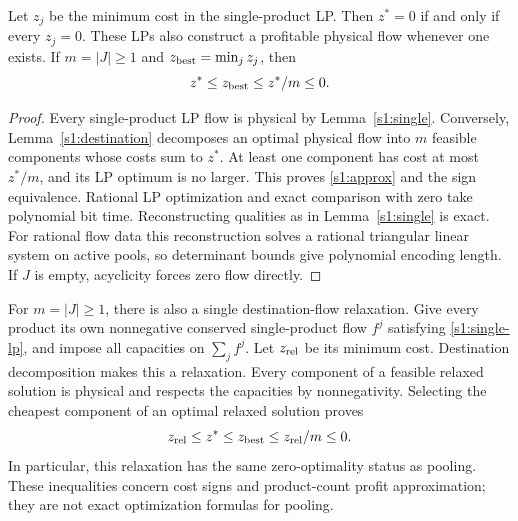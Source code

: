 \begin{theorem}\label{s1:sign}
Let $z_j$ be the minimum cost in the single-product LP. Then
$z^*=0$ if and only if every $z_j=0$. These LPs also construct a
profitable physical flow whenever one exists. If $m=|J|\ge1$ and
$z_{\rm best}=\min_jz_j$, then
\begin{equation}
 z^*\le z_{\rm best}\le z^*/m\le0.\label{s1:approx}
\end{equation}
\end{theorem}
\begin{proof}
Every single-product LP flow is physical by Lemma~\ref{s1:single}.
Conversely, Lemma~\ref{s1:destination} decomposes an optimal physical
flow into $m$ feasible components whose costs sum to $z^*$.
At least one component has cost at most $z^*/m$, and its LP optimum is
no larger. This proves \eqref{s1:approx} and the sign equivalence.
Rational LP optimization and exact comparison with zero take polynomial
bit time. Reconstructing qualities as in Lemma~\ref{s1:single} is exact.
For rational flow data this reconstruction solves a rational triangular
linear system on active pools, so determinant bounds give polynomial
encoding length. If $J$ is empty, acyclicity forces zero flow directly.
\end{proof}

For $m=|J|\ge1$, there is also a single destination-flow relaxation. Give every product
its own nonnegative conserved single-product flow $f^j$ satisfying
\eqref{s1:single-lp}, and impose all capacities on $\sum_j f^j$.
Let $z_{\rm rel}$ be its minimum cost. Destination decomposition makes
this a relaxation. Every component of a feasible relaxed solution is
physical and respects the capacities by nonnegativity. Selecting the
cheapest component of an optimal relaxed solution proves
\[
 z_{\rm rel}\le z^*\le z_{\rm best}\le z_{\rm rel}/m\le0.
\]
In particular, this relaxation has the same zero-optimality status as
pooling. These inequalities concern cost signs and product-count profit
approximation; they are not exact optimization formulas for pooling.

